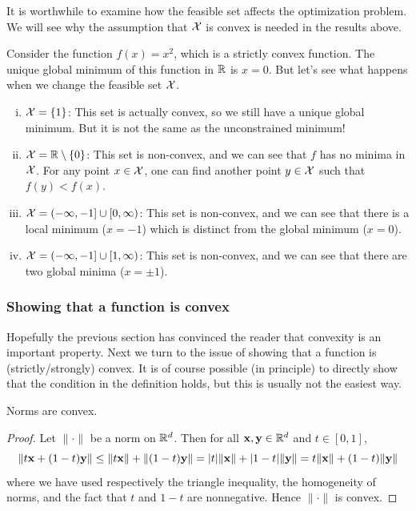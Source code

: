 It is worthwhile to examine how the feasible set affects the optimization problem.
We will see why the assumption that $\mathcal{X}$ is convex is needed in the results above.

Consider the function $f(x) = x^2$, which is a strictly convex function.
The unique global minimum of this function in $\mathbb{R}$ is $x = 0$.
But let's see what happens when we change the feasible set $\mathcal{X}$.
\begin{enumerate}[(i)]
\item $\mathcal{X} = \{1\}$: This set is actually convex, so we still have a unique global minimum.
But it is not the same as the unconstrained minimum!

\item $\mathcal{X} = \mathbb{R} \setminus \{0\}$: This set is non-convex, and we can see that $f$ has no minima in $\mathcal{X}$.
For any point $x \in \mathcal{X}$, one can find another point $y \in \mathcal{X}$ such that $f(y) < f(x)$.

\item $\mathcal{X} = (-\infty,-1] \cup [0,\infty)$: This set is non-convex, and we can see that there is a local minimum ($x = -1$) which is distinct from the global minimum ($x = 0$).

\item $\mathcal{X} = (-\infty,-1] \cup [1,\infty)$: This set is non-convex, and we can see that there are two global minima ($x = \pm 1$).
\end{enumerate}

\subsubsection{Showing that a function is convex}
Hopefully the previous section has convinced the reader that convexity is an important property.
Next we turn to the issue of showing that a function is (strictly/strongly) convex.
It is of course possible (in principle) to directly show that the condition in the definition holds, but this is usually not the easiest way.

\begin{proposition}
Norms are convex.
\end{proposition}
\begin{proof}
Let $\|\cdot\|$ be a norm on $\mathbb{R}^d$. Then for all $\mathbf{x}, \mathbf{y} \in \mathbb{R}^d$ and $t \in [0,1]$,
\[\|t\mathbf{x} + (1-t)\mathbf{y}\| \leq \|t\mathbf{x}\| + \|(1-t)\mathbf{y}\| = |t|\|\mathbf{x}\| + |1-t|\|\mathbf{y}\| = t\|\mathbf{x}\| + (1-t)\|\mathbf{y}\|\]
where we have used respectively the triangle inequality, the homogeneity of norms, and the fact that $t$ and $1-t$ are nonnegative.
Hence $\|\cdot\|$ is convex.
\end{proof}

